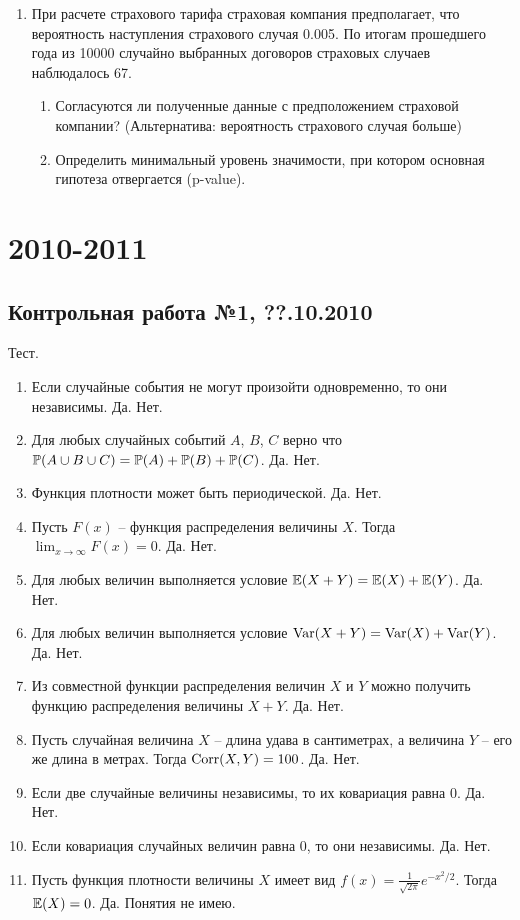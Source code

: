 \documentclass[12pt, a4paper]{article}\usepackage[]{graphicx}\usepackage[]{color}
\begin{document}
\begin{enumerate}
\item При расчете страхового тарифа страховая компания предполагает, что вероятность наступления страхового случая 0.005. По итогам прошедшего года из 10000 случайно выбранных договоров страховых случаев наблюдалось 67.
\begin{enumerate}
\item Согласуются ли полученные данные с предположением страховой компании? (Альтернатива: вероятность страхового случая больше)
\item Определить минимальный уровень значимости, при котором основная гипотеза отвергается (p-value).
\end{enumerate}
\end{enumerate}



\section{2010-2011}



\subsection{Контрольная работа №1, ??.10.2010}

Тест.

\begin{enumerate}
\item Если случайные события не могут произойти одновременно, то они независимы. Да. Нет.
\item  Для любых случайных событий $A$, $B$, $C$ верно что $\P(A\cup B\cup C)=\P(A)+\P(B)+\P(C)$. Да. Нет.
\item  Функция плотности может быть периодической. Да. Нет.
\item  Пусть $F(x)$ -- функция распределения величины $X$. Тогда $\lim_{x\to\infty} F(x)=0$. Да. Нет.
\item  Для любых величин выполняется условие $\E(X+Y)=\E(X)+\E(Y)$. Да. Нет.
\item  Для любых величин выполняется условие $\Var(X+Y)=\Var(X)+\Var(Y)$. Да. Нет.
\item  Из совместной функции распределения величин $X$ и $Y$ можно получить функцию распределения величины $X+Y$. Да. Нет.
\item  Пусть случайная величина $X$ -- длина удава в сантиметрах, а величина $Y$ -- его же длина в метрах. Тогда $\Corr(X,Y)=100$. Да. Нет.
\item  Если две случайные величины независимы, то их ковариация равна 0. Да. Нет.
\item  Если ковариация случайных величин равна 0, то они независимы. Да. Нет.
\item  Пусть функция плотности величины $X$ имеет вид  $f(x)=\frac{1}{\sqrt{2\pi}}e^{-x^2/2}$. Тогда $\E(X)=0$. Да. Понятия не имею.
\end{enumerate}
\end{document}

